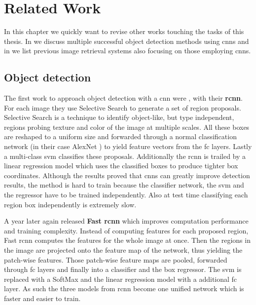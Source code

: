 %
\chapter{Related Work}
\label{sec:related}
In this chapter we quickly want to revise other works touching the tasks of this thesis. In  we discuss multiple successful object detection methods using \glspl{cnn} and in  we list previous image retrieval systems also focusing on those employing \glspl{cnn}.

\section{Object detection}
\label{sec:related:detection}
The first work to approach object detection with a \gls{cnn} were \citet{girshick_rich_2014}, with their \textbf{\gls{rcnn}}. For each image they use Selective Search to generate a set of region proposals. Selective Search is a technique to identify object-like, but type independent, regions probing texture and color of the image at multiple scales. All these boxes are reshaped to a uniform size and forwarded through a normal classification network (in their case AlexNet \citep{krizhevsky_imagenet_2012}) to yield feature vectors from the \gls{fc} layers. Lastly a multi-class \gls{svm} classifies these proposals. Additionally the \gls{rcnn} is trailed by a linear regression model which uses the classified boxes to produce tighter box coordinates. Although the results proved that \glspl{cnn} can greatly improve detection results, the method is hard to train because the classifier network, the \gls{svm} and the regressor have to be trained independently. Also at test time classifying each region box independently is extremely slow.

A year later again \citet{girshick_fast_2015} released \textbf{Fast \gls{rcnn}} which improves computation performance and training complexity. Instead of computing features for each proposed region, Fast \gls{rcnn} computes the features for the whole image at once. Then the regions in the image are projected onto the feature map of the network, thus yielding the patch-wise features. Those patch-wise feature maps are pooled, forwarded through \gls{fc} layers and finally into a classifier and the box regressor. The \gls{svm} is replaced with a SoftMax and the linear regression model with a additional \gls{fc} layer. As such the three models from \gls{rcnn} become one unified network which is faster and easier to train.

